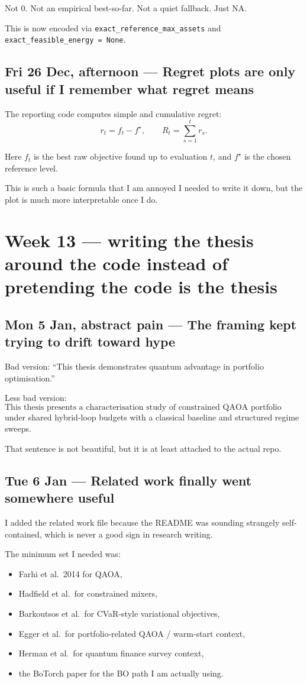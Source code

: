 \documentclass[11pt]{article}
\newcommand{\entry}[2]{\subsection*{#1 --- #2}}
\newcommand{\repo}[1]{\texttt{#1}}
\begin{document}
Not \(0\).
Not an empirical best-so-far.
Not a quiet fallback.
Just \(\text{NA}\).

This is now encoded via \repo{exact\_reference\_max\_assets} and
\repo{exact\_feasible\_energy = None}.

\entry{Fri 26 Dec, afternoon}{Regret plots are only useful if I remember what regret means}

The reporting code computes simple and cumulative regret:
\[
r_t = f_t - f^\star,
\qquad
R_t = \sum_{s=1}^{t} r_s.
\]

Here \(f_t\) is the best raw objective found up to evaluation \(t\), and \(f^\star\) is the
chosen reference level.

This is such a basic formula that I am annoyed I needed to write it down, but the plot is much
more interpretable once I do.

\section*{Week 13 --- writing the thesis around the code instead of pretending the code is the thesis}

\entry{Mon 5 Jan, abstract pain}{The framing kept trying to drift toward hype}

Bad version: ``This thesis demonstrates quantum advantage in portfolio optimisation.''

Less bad version:
\[
\text{This thesis presents a characterisation study of constrained QAOA portfolio optimisation}
\]
under shared hybrid-loop budgets with a classical baseline and structured regime sweeps.

That sentence is not beautiful, but it is at least attached to the actual repo.

\entry{Tue 6 Jan}{Related work finally went somewhere useful}

I added the related work file because the README was sounding strangely self-contained, which is
never a good sign in research writing.

The minimum set I needed was:
\begin{itemize}[leftmargin=1.4em]
\item Farhi et al.\ 2014 for QAOA,
\item Hadfield et al.\ for constrained mixers,
\item Barkoutsos et al.\ for CVaR-style variational objectives,
\item Egger et al.\ for portfolio-related QAOA / warm-start context,
\item Herman et al.\ for quantum finance survey context,
\item the BoTorch paper for the BO path I am actually using.
\end{itemize}
\end{document}
